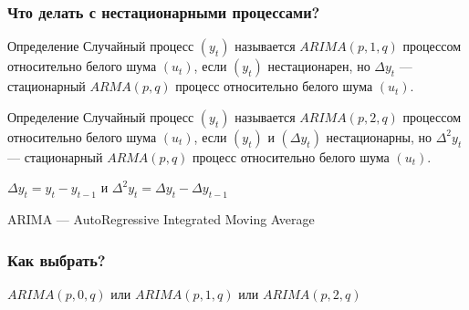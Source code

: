 \begin{frame}
  \frametitle{Что делать с нестационарными процессами?}

  \begin{block}{Определение}
    Случайный процесс $(y_t)$ называется $ARIMA(p, 1, q)$ процессом относительно белого шума $(u_t)$, 
    если $(y_t)$ нестационарен, но $\Delta y_t$ — стационарный $ARMA(p, q)$ процесс относительно белого шума $(u_t)$.  
  \end{block}

  \pause

  \begin{block}{Определение}
    Случайный процесс $(y_t)$ называется $ARIMA(p, 2, q)$ процессом относительно белого шума $(u_t)$, 
    если $(y_t)$ и $(\Delta y_t)$ нестационарны, но $\Delta^2 y_t$ — стационарный $ARMA(p, q)$ процесс относительно белого шума $(u_t)$.  
  \end{block}

  \pause
  $\Delta y_t = y_t - y_{t-1}$ и $\Delta^2 y_t = \Delta y_t - \Delta y_{t-1}$

  \pause 
  ARIMA — \alert{A}uto\alert{R}egressive \alert{I}ntegrated \alert{M}oving \alert{A}verage
  
\end{frame}

\begin{frame}
  \frametitle{Как выбрать?}
  
  $ARIMA(p, 0, q)$ или $ARIMA(p, 1, q)$ или $ARIMA(p, 2, q)$
  \begin{itemize}
    

    

    
    
  \end{itemize}

\end{frame}

